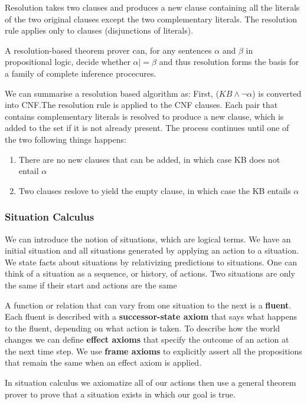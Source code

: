 \documentclass{article}
\begin{document}
Resolution takes two clauses and produces a new clause containing all the literals of the two original clauses except the two complementary literals. The resolution rule applies only to clauses (disjunctions of literals). 


A resolution-based theorem prover can, for any sentences $\alpha$ and $\beta$ in propositional logic, decide whether $\alpha |= \beta$ and thus resolution forms the basis for a family of complete inference procecures. 

We can summarise a resolution based algorithm as: First, ($KB \wedge \neg \alpha$) is converted into CNF.The resolution rule is applied to the CNF clauses. Each pair that contains complementary literals is resolved to produce a new clause, which is added to the set if it is not already present. The process continues until one of the two following things happens:
\begin{enumerate}
    \item There are no new clauses that can be added, in which case KB does not entail $\alpha$
    \item Two clauses reslove to yield the empty clause, in which case the KB entails $\alpha$

    
\end{enumerate}



\subsubsection{Situation Calculus}

We can introduce the notion of situations, which are logical terms. We have an initial situation and all situations generated by applying an action to a situation. We state facts about situations by relativizing predictions to situations. One can think of a situation as a sequence, or history, of actions. Two situations are only the same if their start and actions are the same

A function or relation that can vary from one situation to the next is a \textbf{fluent}. Each fluent is described with a \textbf{successor-state axiom} that says what happens to the fluent, depending on what action is taken. To describe how the world changes we can define \textbf{effect axioms} that specify the outcome of an action at the next time step. We use \textbf{frame axioms} to explicitly assert all the propositions that remain the same when an effect axiom is applied. 

In situation calculus we axiomatize all of our actions then use a general theorem prover to prove that a situation exists in which our goal is true.
\end{document}
